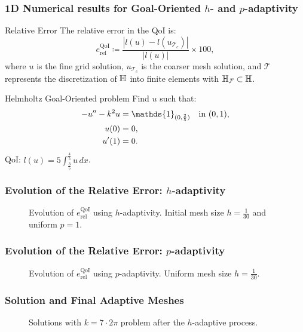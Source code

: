 \begin{frame}
  \frametitle{1D Numerical results for Goal-Oriented $h$- and $p$-adaptivity}
  \small %

  \begin{block}{Relative Error}
    The relative error in the QoI is:
    \begin{equation}
      e_{\textrm{rel}}^{\textrm{QoI}} \coloneqq \frac{|l(u) - l(u_{\mathcal{T}_{c}})|}{|l(u)|} \times 100,
    \end{equation}
    where $u$ is the fine grid solution, $u_{\mathcal{T}_{c}}$ is the coarser mesh solution, and $\mathcal{T}$ represents the discretization of $\mathbb{H}$ into finite elements with $\mathbb{H}_{\mathcal{F}} \subset \mathbb{H}$.
  \end{block} 

  \begin{block}{Helmholtz Goal-Oriented problem}
    Find $u$ such that:
    \begin{align}
      \tiny %
      -u'' -k^{2}u & = \mathds{1}_{(0,\frac{2}{5})} \quad \text{in} \ (0,1), \\
      u(0)         & = 0, \\
      u'(1)        & = 0.
    \end{align}
    QoI: $l(u)= 5 \int_{\frac{3}{5}}^{\frac{4}{5}} u \, dx$.
  \end{block}
\end{frame}

\begin{frame}
	\frametitle{Evolution of the Relative Error: $h$-adaptivity}
	\begin{figure}
  	\hspace{-1cm}
	\centering
  	
  	\caption{Evolution of $e_{\textrm{rel}}^{\textrm{QoI}}$ using $h$-adaptivity. Initial mesh size $h=\frac{1}{30}$ and uniform $p=1$.}
	\end{figure}	
\end{frame}

\begin{frame}
	\frametitle{Evolution of the Relative Error: $p$-adaptivity}
	\begin{figure}
  	\centering
  	
  	\caption{Evolution of $e_{\textrm{rel}}^{\textrm{QoI}}$ using $p$-adaptivity. Uniform mesh size $h=\frac{1}{30}$.}
	\end{figure}	
\end{frame}

\begin{frame}
	\frametitle{Solution and Final Adaptive Meshes}
	\pgfplotsset{colormap/YlOrRd}

\begin{figure}
  \centering
  
  \caption{Solutions with $k = 7 \cdot 2 \pi$ problem after the $h$-adaptive process.}
\end{figure}
\end{frame}